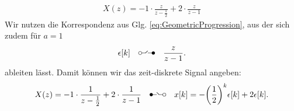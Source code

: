 \documentclass[11pt,a4paper,DIV=12]{scrartcl}
\renewcommand{\ztransf}{\mbox{\setlength{\unitlength}{0.1em}%
                            \begin{picture}(20,10)%
                              \put(2,3){\circle{4}}%
                              \put(4,3){\line(1,0){4.75}}%
                              \multiput(8.625,3.15)(0.25,0.25){11}{%
                                \makebox(0,0){\rmfamily\tiny .}}%
                              \put(17,3){\line(-1,0){5.75}}%
                              \put(18,3){\circle*{4}}%
                            \end{picture}%
                           }
                      }
\renewcommand{\Ztransf}{\mbox{\setlength{\unitlength}{0.1em}%
                            \begin{picture}(20,10)%
                              \put(2,3){\circle*{4}}%
                              \put(3,3){\line(1,0){5.75}}%
                              \multiput(11.375,3.15)(-0.25,0.25){11}{%
                                \makebox(0,0){\rmfamily\tiny .}}%
                              \put(16,3){\line(-1,0){4.75}}%
                              \put(18,3){\circle{4}}%
                            \end{picture}%
                           }
                      }
\begin{document}
\begin{align}
	X(z)=-1\cdot\frac{z}{z-\frac{1}{2}}+2\cdot\frac{z}{z-1}
\end{align}
Wir nutzen die Korrespondenz aus Glg. \eqref{eq:GeometricProgression}, aus der sich zudem für $a=1$
\begin{align}
	\epsilon[k]\quad\ztransf\quad\frac{z}{z-1}.
\end{align}
ableiten lässt.
Damit können wir das zeit-diskrete Signal angeben:
\begin{align}
	X(z)=-1\cdot\frac{1}{z-\frac{1}{2}}+2\cdot\frac{1}{z-1}\quad\Ztransf\quad x[k]=-\bigg(\frac{1}{2}\bigg)^k\epsilon[k]+2\epsilon[k].
\end{align}
\end{document}
